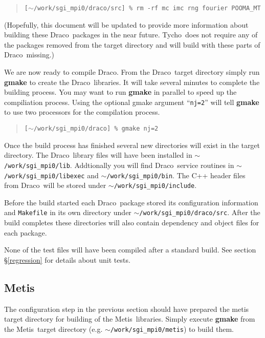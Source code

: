 \documentclass[11pt]{nmemo}
\newcommand{\comp}[1]{\normalfont\footnotesize\texttt{#1}\normalsize}
\newcommand{\draco}{{\normalfont\sffamily Draco}}
\newcommand{\tycho}{{\normalfont\sffamily Tycho}}
\newcommand{\metis}{{\normalfont\sffamily Metis}}
\begin{document}
\footnotesize
\begin{verse}
\texttt{[$\sim$/work/sgi\_mpi0/draco/src] \% rm -rf mc imc rng fourier POOMA\_MT}
\end{verse}
\normalsize

(Hopefully, this document will be updated to provide more information
about building these \draco\ packages in the near future.  \tycho\ 
does not require any of the packages removed from the target directory
and will build with these parts of \draco\ missing.)

We are now ready to compile \draco.  From the \draco\ target directory
simply run \textbf{gmake} to create the \draco\ libraries.  It will
take several minutes to complete the building process.  You may want
to run \textbf{gmake} in parallel to speed up the compiliation
process.  Using the optional gmake argument ``\comp{nj=2}'' will tell 
\textbf{gmake} to use two processors for the compilation process.

\footnotesize
\begin{verse}
\texttt{[$\sim$/work/sgi\_mpi0/draco] \% gmake nj=2}
\end{verse}
\normalsize

Once the build process has finished several new directories will exist 
in the target directory.  The \draco\ library files will have been
installed in \comp{$\sim$/work/sgi\_mpi0/lib}.  Addtionally you will
find \draco\ service routines in \comp{$\sim$/work/sgi\_mpi0/libexec}
and \comp{$\sim$/work/sgi\_mpi0/bin}.  The C++ header files from
\draco\ will be stored under \comp{$\sim$/work/sgi\_mpi0/include}.

Before the build started each \draco\ package stored its configuration
information and \comp{Makefile} in its own directory under
\comp{$\sim$/work/sgi\_mpi0/draco/src}.  After the build completes
these directories will also contain dependency and object files for
each package.

None of the test files will have been compiled after a standard
build.  See section \S\ref{regression} for details about unit tests.

\subsection{\metis}

The configuration step in the previous section should have prepared
the metis target directory for building of the \metis\ libraries.
Simply execute \textbf{gmake} from the \metis\ target directory
(e.g. \comp{$\sim$/work/sgi\_mpi0/metis}) to build them.
\end{document}

